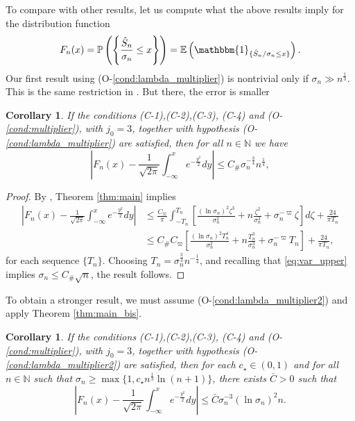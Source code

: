 \documentclass{amsart}
\numberwithin{equation}{section}
\newtheorem{cor}[thm]{Corollary}
\newcommand\bE{{\mathbb E}}
\newcommand\bN{{\mathbb N}}
\newcommand\bP{{\mathbb P}}
\newcommand\Id{{\mathbbm{1}}}
\newcommand{\hS}{\hat{S}}
\newcommand{\Const}{C_{\#}}
\begin{document}
To compare with other results, let us compute what the above results imply for the distribution function
\begin{equation}
\label{eq:Fn def}
F_n(x)=\bP \left( \left\{ \frac{\hS_n}{\sigma_n} \leq x \right\} \right) = \bE \left( \Id_{ \{ \hat{S}_n/\sigma_n \le x \} } \right) .
\end{equation}
Our first result using (O-\ref{cond:lambda_multiplier}) is nontrivial only if $\sigma_n\gg n^{\frac 13}$. This is the same restriction in \cite{H20}. But there, the error is smaller
\begin{cor}
If the conditions (C-1),(C-2),(C-3), (C-4) and (O-\ref{cond:multiplier}),  with $j_0=3$, together with hypothesis (O-\ref{cond:lambda_multiplier}) are satisfied,
then for all $n\in\bN$ we have
\begin{equation}\label{eq:final_est1}
\left|F_n(x)-\frac{1}{\sqrt{2\pi}}\int_{-\infty}^xe^{-\frac {y^2}2}dy\right|\leq \Const\sigma_n^{-\frac 34}n^{\frac 14},
\end{equation}
\end{cor}
\begin{proof}
By \cite[equation (3.13) of Chapter XVI.3]{Fe2}, Theorem \ref{thm:main} implies
\[
\begin{split}
\left|F_n(x)-\frac{1}{\sqrt{2\pi}}\int_{-\infty}^xe^{-\frac {y^2}2}dy\right|&\leq \frac {C_\varpi}\pi\int_{-T_n}^{T_n}\left[\frac{(\ln \sigma_n)^2\zeta^3}{\sigma_n^2}+
n\frac{\zeta^2}{\sigma_n^3}+\sigma_n^{-\varpi}\zeta\right] d\zeta+ \frac{24 }{\pi T_n}\\
&\leq \Const C_\varpi \left[\frac{(\ln \sigma_n)^2T_n^4}{\sigma_n^2}+n\frac{T_n^3}{\sigma_n^3}+\sigma_n^{-\varpi}T_n\right]+\frac{24 }{\pi T_n},
\end{split}
\]
for each sequence $\{T_n\}$. Choosing $T_n=\sigma_n^{\frac 34}n^{-\frac 14}$, and recalling that \eqref{eq:var_upper} implies $\sigma_n\leq \Const \sqrt n$, the result follows.
\end{proof}
To obtain a stronger result, we must assume  (O-\ref{cond:lambda_multiplier2}) and apply Theorem \ref{thm:main_bis}. 
\begin{cor}
\label{cor:better corollary}
If the conditions (C-1),(C-2),(C-3), (C-4) and (O-\ref{cond:multiplier}),  with $j_0=3$, together with hypothesis (O-\ref{cond:lambda_multiplier2}) are satisfied, then for each $c_\star\in (0,1)$ and for all $n\in\bN$ such that $\sigma_n\geq \max\{1,c_\star n^{\frac 13}\ln (n+1)\}$, there exists $\bar C>0$ such that
\begin{equation}\label{eq:final_est2}
\left|F_n(x)-\frac{1}{\sqrt{2\pi}}\int_{-\infty}^xe^{-\frac {y^2}2}dy\right|\leq \bar C \sigma_n^{-3}(\ln \sigma_n)^2 n.
\end{equation}
\end{cor}
\end{document}
